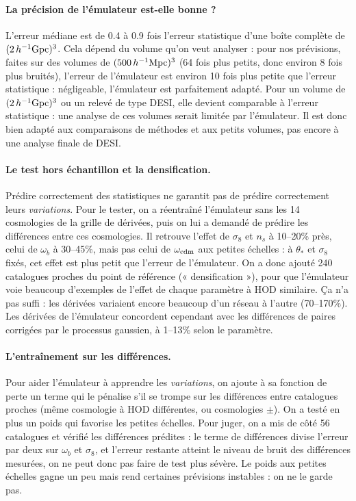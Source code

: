 \paragraph{La précision de l'émulateur est-elle bonne ?} L'erreur médiane est de 0.4 à 0.9 fois l'erreur statistique d'une boîte complète de $(2\,h^{-1}{\rm Gpc})^3$. Cela dépend du volume qu'on veut analyser : pour nos prévisions, faites sur des volumes de $(500\,h^{-1}\mathrm{Mpc})^3$ (64 fois plus petits, donc environ 8 fois plus bruités), l'erreur de l'émulateur est environ 10 fois plus petite que l'erreur statistique : négligeable, l'émulateur est parfaitement adapté. Pour un volume de $(2\,h^{-1}{\rm Gpc})^3$ ou un relevé de type DESI, elle devient comparable à l'erreur statistique : une analyse de ces volumes serait limitée par l'émulateur. Il est donc bien adapté aux comparaisons de méthodes et aux petits volumes, pas encore à une analyse finale de DESI.

\paragraph{Le test hors échantillon et la densification.} Prédire correctement des statistiques ne garantit pas de prédire correctement leurs \emph{variations}. Pour le tester, on a réentraîné l'émulateur sans les 14 cosmologies de la grille de dérivées, puis on lui a demandé de prédire les différences entre ces cosmologies. Il retrouve l'effet de $\sigma_8$ et $n_s$ à 10--20\% près, celui de $\omega_b$ à 30--45\%, mais pas celui de $\omega_{\rm cdm}$ aux petites échelles : à $\theta_*$ et $\sigma_8$ fixés, cet effet est plus petit que l'erreur de l'émulateur. On a donc ajouté 240 catalogues proches du point de référence (« densification »), pour que l'émulateur voie beaucoup d'exemples de l'effet de chaque paramètre à HOD similaire. Ça n'a pas suffi : les dérivées variaient encore beaucoup d'un réseau à l'autre (70--170\%). Les dérivées de l'émulateur concordent cependant avec les différences de paires corrigées par le processus gaussien, à 1--13\% selon le paramètre.

\paragraph{L'entraînement sur les différences.} Pour aider l'émulateur à apprendre les \emph{variations}, on ajoute à sa fonction de perte un terme qui le pénalise s'il se trompe sur les différences entre catalogues proches (même cosmologie à HOD différentes, ou cosmologies $\pm$). On a testé en plus un poids qui favorise les petites échelles. Pour juger, on a mis de côté 56 catalogues et vérifié les différences prédites : le terme de différences divise l'erreur par deux sur $\omega_b$ et $\sigma_8$, et l'erreur restante atteint le niveau de bruit des différences mesurées, on ne peut donc pas faire de test plus sévère. Le poids aux petites échelles gagne un peu mais rend certaines prévisions instables : on ne le garde pas.


